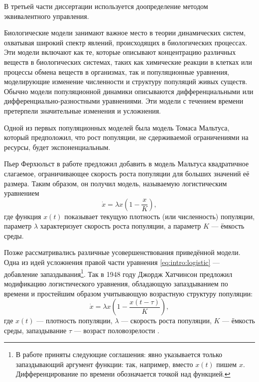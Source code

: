 В третьей части диссертации используется доопределение методом эквивалентного управления.

{\actuality} Биологические модели занимают важное место в теории динамических систем, охватывая широкий спектр явлений, происходящих в биологических процессах. Эти модели включают как те, которые описывают концентрацию различных веществ в биологических системах, таких как химические реакции в клетках или процессы обмена веществ в организмах, так и популяционные уравнения, моделирующие изменение численности и структуру популяций живых существ. Обычно модели популяционной динамики описываются дифференциальными или дифференциально-разностными уравнениями. 
Эти модели с течением времени претерпели значительные изменения и усложнения.

Одной из первых популяционных моделей была модель Томаса Мальтуса, который предположил, что рост популяции, не сдерживаемой ограничениями на ресурсы, будет экспоненциальным. %

Пьер Ферхюльст в работе \cite{Verhulst1838} предложил добавить в модель Мальтуса квадратичное слагаемое, ограничивающее скорость роста популяции для больших значений её размера. Таким образом, он получил модель, называемую логистическим уравнением
\begin{equation}
	\label{eq:intro:logistic}
	\dot{x}=\lambda x\left(1-\frac{x}{K}\right),
\end{equation}
где функция $x(t)$ показывает текущую плотность (или численность) популяции, параметр $\lambda$ характеризует скорость роста популяции, а параметр $K$ --- ёмкость среды.

Позже рассматривались различные усовершенствования приведённой модели. Одна из идей усложнения правой части уравнения \eqref{eq:intro:logistic} --- добавление запаздывания\footnote{В работе приняты следующие соглашения: явно указывается только запаздывающий аргумент функции: так, например, вместо $x(t)$ пишем $x$. Дифференцирование по времени обозначается точкой над функцией.}. Так в 1948 году Джордж Хатчинсон предложил модификацию логистического уравнения, обладающую запаздыванием по времени и простейшим образом учитывающую возрастную структуру популяции:
%
\begin{equation}
	\label{eq:intro:hutch}
	\dot{x}=\lambda x\left(1 - \frac{x(t-\tau)}{K}\right),
\end{equation}
%
где $x(t)$ --- плотность популяции, $\lambda$ --- скорость роста популяции, $K$ --- ёмкость среды, запаздывание $\tau$ --- возраст половозрелости \cite{Hutchinson1948}. %

